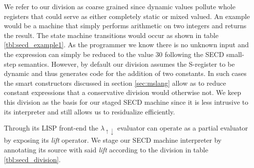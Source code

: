 \documentclass[a4paper,12pt,twoside,openright]{report}
\theoremstyle{definition}
\newcommand{\mslang}{$\lambda_{\uparrow\downarrow}$}
\begin{document}
We refer to our division as coarse grained since dynamic values pollute whole registers that could serve as either completely static or mixed valued. An example would be a machine that simply performs arithmetic on two integers and returns the result. The state machine transitions would occur as shown in table \ref{tbl:secd_example1}. As the programmer we know there is no unknown input and the expression can simply be reduced to the value 30 following the SECD small-step semantics. However, by default our division assumes the S-register to be dynamic and thus generates code for the addition of two constants. In such cases the smart constructors discussed in section \ref{sec:mslang} allow as to reduce constant expressions that a conservative division would otherwise not. We keep this division as the basis for our staged SECD machine since it is less intrusive to its interpreter and still allows us to residualize efficiently.

Through its LISP front-end the \mslang{} evaluator can operate as a partial evaluator by exposing its \textit{lift} operator. We stage our SECD machine interpreter by annotating its source with said \textit{lift} according to the division in table \ref{tbl:secd_division}.
\end{document}
